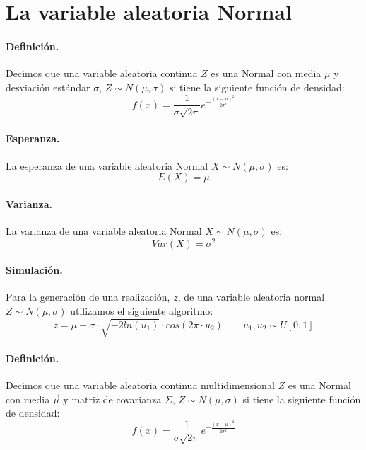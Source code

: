 
\section{La variable aleatoria Normal}

\paragraph{Definici\'on.} Decimos que una variable aleatoria continua $Z$ es 
una Normal con media $\mu$ y desviaci\'on est\'andar $\sigma$, 
$Z \sim N(\mu, \sigma)$ si tiene la siguiente funci\'on de densidad:
\begin{displaymath}
f(x) = \frac{1}{\sigma \sqrt{2 \pi}} e^{-\frac{(x-\mu)^2}{2 \sigma^2}}
\end{displaymath}

\paragraph{Esperanza.} La esperanza de una variable aleatoria Normal 
$X \sim N(\mu,\sigma)$ es:
\begin{displaymath}
E(X) = \mu
\end{displaymath}

\paragraph{Varianza.} La varianza de una variable aleatoria Normal 
$X \sim N(\mu,\sigma)$ es:
\begin{displaymath}
Var(X)= \sigma^2
\end{displaymath}

\paragraph{Simulaci\'on.} Para la generaci\'on de una realizaci\'on, $z$, de 
una variable aleatoria normal $Z \sim N(\mu, \sigma)$ utilizamos el siguiente 
algoritmo:
\begin{displaymath}
z = \mu + \sigma\cdot \sqrt{-2 ln(u_1)} \cdot cos(2 \pi \cdot u_2)
\qquad u_1, u_2 \sim U[0,1]
\end{displaymath}

\paragraph{Definici\'on.} Decimos que una variable aleatoria continua 
multidimensional $Z$ es una Normal con media $\vec{\mu}$ y matriz de covarianza
$\Sigma$, $Z \sim N(\mu, \sigma)$ si tiene la siguiente funci\'on de densidad:
\begin{displaymath}
f(x) = \frac{1}{\sigma \sqrt{2 \pi}} e^{-\frac{(x-\mu)^2}{2 \sigma^2}}
\end{displaymath}

